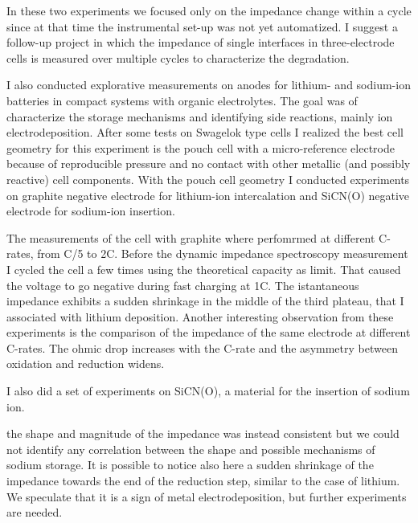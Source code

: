 In these two experiments we focused only on the impedance change within a cycle since at that time the instrumental set-up was not yet automatized. I suggest a follow-up project in which the impedance of single interfaces in three-electrode cells is measured over multiple cycles to characterize the degradation.

I also conducted explorative measurements on anodes for lithium- and sodium-ion batteries in compact systems with organic electrolytes. The goal was of characterize the storage mechanisms and identifying side reactions, mainly ion electrodeposition. After some tests on Swagelok type cells I realized the best cell geometry for this experiment is the pouch cell with a micro-reference electrode because of reproducible pressure and no contact with other metallic (and possibly reactive) cell components. With the pouch cell geometry I conducted experiments on graphite negative electrode for lithium-ion intercalation and SiCN(O) negative electrode for sodium-ion insertion.

The measurements of the cell with graphite where perfomrmed at different C-rates, from C/5 to 2C. Before the dynamic impedance spectroscopy measurement I cycled the cell a few times using the theoretical capacity as limit. That caused the voltage to go negative during fast charging at 1C. The istantaneous impedance exhibits a sudden shrinkage in the middle of the third plateau, that I associated with lithium deposition. Another interesting observation from these experiments is the comparison of the impedance of the same electrode at different C-rates. The ohmic drop increases with the C-rate and the asymmetry between oxidation and reduction widens.

I also did a set of experiments on SiCN(O), a material for the insertion of sodium ion. 

the shape and magnitude of the impedance was instead consistent but we could not identify any correlation between the shape and possible mechanisms of sodium storage. It is possible to notice also here a sudden shrinkage of the impedance towards the end of the reduction step, similar to the case of lithium. We speculate that it is a sign of metal electrodeposition, but further experiments are needed.

